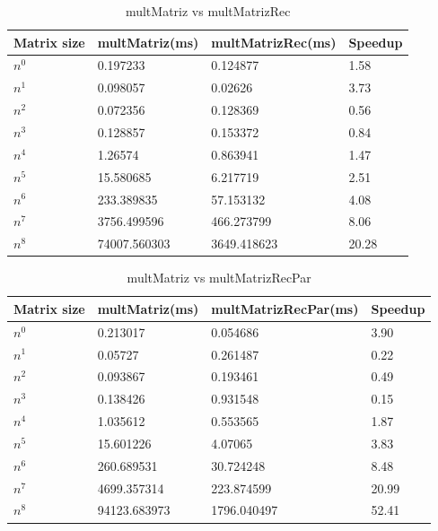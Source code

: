 \documentclass[12pt, a4paper]{article}
\begin{document}
\begin{table}[h]
\centering
    \begin{tabular}{ | m{4cm} | m{3cm} | m{4cm} | m{3cm} | }
    \hline
    Matrix size & multMatriz(ms) & multMatrizRec(ms) & Speedup \\ 
    \hline
    $n^0$ & 0.197233 & 0.124877 & 1.58 \\
    $n^1$ & 0.098057 & 0.02626 & 3.73 \\
    $n^2$ & 0.072356 & 0.128369 & 0.56 \\
    $n^3$ & 0.128857 & 0.153372 & 0.84 \\
    $n^4$ & 1.26574 & 0.863941 & 1.47 \\
    $n^5$ & 15.580685 & 6.217719 & 2.51 \\
    $n^6$ & 233.389835 & 57.153132 & 4.08 \\
    $n^7$ & 3756.499596 & 466.273799 & 8.06 \\
    $n^8$ & 74007.560303 & 3649.418623 & 20.28 \\
    \hline
    \end{tabular}
    \caption{multMatriz vs multMatrizRec}
    \label{table:matrix_comparison_rec}
\end{table}

\begin{table}[h]
    \centering
    \begin{tabular}{ | m{2cm} | m{3cm} | m{4cm} | m{3cm} | }
    \hline
    Matrix size & multMatriz(ms) & multMatrizRecPar(ms) & Speedup \\ 
    \hline
    $n^0$ & 0.213017 & 0.054686 & 3.90 \\
    $n^1$ & 0.05727 & 0.261487 & 0.22 \\
    $n^2$ & 0.093867 & 0.193461 & 0.49 \\
    $n^3$ & 0.138426 & 0.931548 & 0.15 \\
    $n^4$ & 1.035612 & 0.553565 & 1.87 \\
    $n^5$ & 15.601226 & 4.07065 & 3.83 \\
    $n^6$ & 260.689531 & 30.724248 & 8.48 \\
    $n^7$ & 4699.357314 & 223.874599 & 20.99 \\
    $n^8$ & 94123.683973 & 1796.040497 & 52.41 \\
    \hline
    \end{tabular}
    \caption{multMatriz vs multMatrizRecPar}
    \label{table:matrix_comparison_rec_par}
\end{table}
\end{document}
